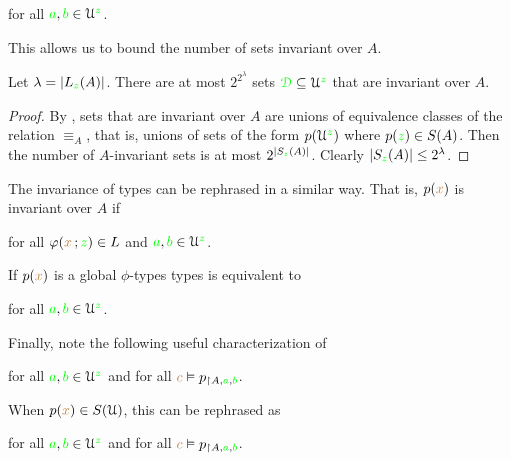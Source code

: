 \hfill for all ${\color{green} a},{\color{green} b}\in\EuScript U^{\color{green} z}$.

This allows us to bound the number of sets invariant over $A$.

\begin{proposition}\label{prop_numberIS}
Let $\lambda=|L_{\color{green} z}(A)|$.
There are at most $2^{2^{\lambda}}$ sets ${\color{green}\EuScript D}\subseteq\EuScript U^{\color{green} z}$ that are invariant over $A$.
\end{proposition}
\begin{proof}
  By , sets that are invariant over $A$ are unions of equivalence classes of the relation $\equiv_A$, that is, unions of sets of the form $p(\EuScript U^{\color{green} z})$ where $p({\color{green} z})\in S\/(A)$.
  Then the number of $A$-invariant sets is at most $2^{|S_{\color{green} z}(A)|}$.
  Clearly $|S_{\color{green} z}(A)|\le 2^\lambda$.
\end{proof} 

The invariance of types can be rephrased in a similar way.
That is, $p({\color{brown} x})$ is invariant over $A$ if 

\hfill for all $\varphi({\color{brown} x}\,;{\color{green} z})\in L$ and ${\color{green} a},{\color{green} b}\in\EuScript U^{\color{green} z}$.


If $p({\color{brown} x})$ is a global $\phi$-types types  is equivalent to

\hfill for all ${\color{green} a},{\color{green} b}\in\EuScript U^{\color{green} z}$.

Finally, note the following useful characterization of 

\hfill for all ${\color{green} a},{\color{green} b}\in\EuScript U^{\color{green} z}$ and for all ${\color{brown} c}\vDash p_{\restriction A,{\color{green} a},{\color{green} b}}$.

When $p({\color{brown} x})\in S(\EuScript U)$, this can be rephrased as

\hfill for all ${\color{green} a},{\color{green} b}\in\EuScript U^{\color{green} z}$ and for all ${\color{brown} c}\vDash p_{\restriction A,{\color{green} a},{\color{green} b}}$.

